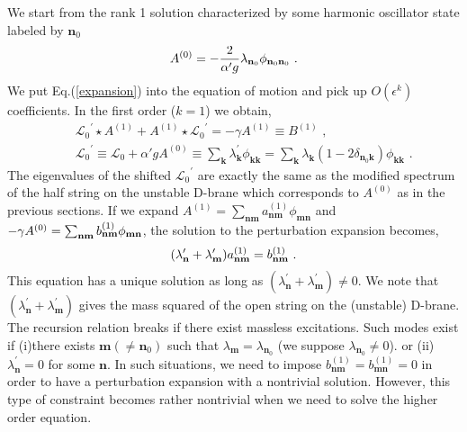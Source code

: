 \documentclass[a4paper,aps,preprint,nofootinbib,eqsecnum]{revtex4}
\begin{document}
We start from the rank 1 solution characterized by some harmonic oscillator
state labeled by $\mathbf{n}_{0}$
\begin{equation}
A^{\left( 0\right) }=-\frac{2}{\alpha' g}
\lambda _{\mathbf{n}_{0}}\phi _{\mathbf{n}_{0}\mathbf{%
n}_{0}}\,\,.
\end{equation}%
We put Eq.(\ref{expansion}) into the equation of motion and pick up $%
O(\epsilon ^{k})$ coefficients. In the first order ($k=1$) we obtain,
\begin{eqnarray}
&&{\mathcal{L}_{0}}^{\prime }\star A^{\left( 1\right) }+A^{\left( 1\right)
}\star {\mathcal{L}_{0}}^{\prime }=-\gamma A^{\left( 1\right) }\equiv
B^{\left( 1\right) }\,\,,  \label{first-order} \\
&&{\mathcal{L}_{0}}^{\prime }\equiv {\mathcal{L}_{0}}+
\alpha' g A^{\left( 0\right)
}\equiv \sum_{\mathbf{k}}\lambda _{\mathbf{k}}^{\prime }\phi _{\mathbf{kk}%
}=\sum_{\mathbf{k}}\lambda _{\mathbf{k}}(1-2\delta _{\mathbf{n}_{0}\mathbf{k}%
})\phi _{\mathbf{kk}}\,\,.
\end{eqnarray}%
The eigenvalues of the shifted ${\mathcal{L}_{0}}^{\prime }$ are exactly the
same as the modified spectrum of the half string on the unstable D-brane
which corresponds to $A^{\left( 0\right) }$ as in the previous sections. If
we expand $A^{\left( 1\right) }=\sum_{\mathbf{nm}}a_{\mathbf{nm}}^{(1)}\phi
_{\mathbf{mn}}$ and $-\gamma A^{\left( 0\right) }=\sum_{\mathbf{nm}}b_{%
\mathbf{nm}}^{(1)}\phi _{\mathbf{mn}}$, the solution to the perturbation
expansion becomes,
\begin{equation}
(\lambda _{\mathbf{n}}^{\prime }+\lambda _{\mathbf{m}}^{\prime })a_{\mathbf{%
nm}}^{(1)}=b_{\mathbf{nm}}^{(1)}\,\,.  \label{Loprime}
\end{equation}%
This equation has a unique solution as long as $(\lambda _{\mathbf{n}%
}^{\prime }+\lambda _{\mathbf{m}}^{\prime })\neq 0$. We note that $(\lambda
_{\mathbf{n}}^{\prime }+\lambda _{\mathbf{m}}^{\prime })$ gives the mass
squared of the open string on the (unstable) D-brane. The recursion relation
breaks if there exist massless excitations. Such modes exist if (i)there
exists $\mathbf{m}(\neq \mathbf{n}_{0})$ such that $\lambda _{\mathbf{m}%
}=\lambda _{\mathbf{n}_{0}}$ (we suppose $\lambda _{\mathbf{n}_{0}}\neq 0$).
or (ii) $\lambda _{\mathbf{n}}^{\prime }=0$ for some $\mathbf{n}$. In such
situations, we need to impose $b_{\mathbf{nm}}^{(1)}=b_{\mathbf{mn}}^{(1)}=0$
in order to have a perturbation expansion with a nontrivial solution.
However, this type of constraint becomes rather nontrivial when we need to
solve the higher order equation.
\end{document}
